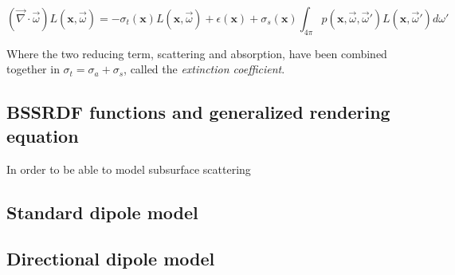 $$
(\vec{\nabla} \cdot \vec{\omega}) L(\mathbf{x}, \vec{\omega}) =   -\sigma_t(\mathbf{x}) L(\mathbf{x}, \vec{\omega}) + \epsilon(\mathbf{x}) + \sigma_s(\mathbf{x}) \int_{4\pi} p(\mathbf{x}, \vec{\omega}, \vec{\omega}') L(\mathbf{x},\vec{\omega}') d\omega'
$$

Where the two reducing term, scattering and absorption, have been combined together in $\sigma_t = \sigma_a + \sigma_s$, called the \emph{extinction coefficient}.


\subsection{BSSRDF functions and generalized rendering equation}

In order to be able to model subsurface scattering 

\subsection{Standard dipole model}
\subsection{Directional dipole model}
